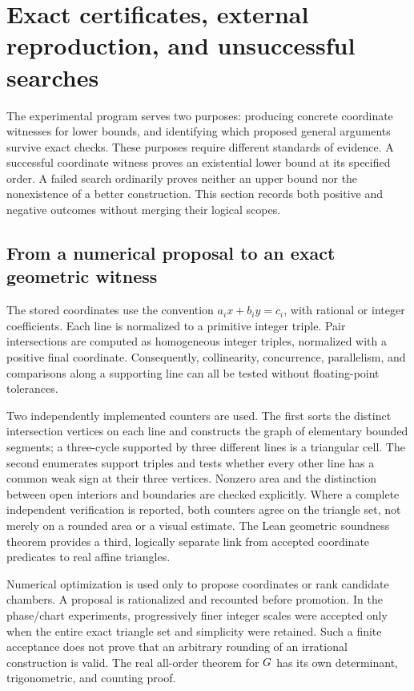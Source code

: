 \section{Exact certificates, external reproduction, and unsuccessful searches}
\label{exp:section}

The experimental program serves two purposes: producing concrete coordinate
witnesses for lower bounds, and identifying which proposed general arguments
survive exact checks. These purposes require different standards of evidence.
A successful coordinate witness proves an existential lower bound at its
specified order. A failed search ordinarily proves neither an upper bound nor
the nonexistence of a better construction. This section records both positive
and negative outcomes without merging their logical scopes.

\subsection{From a numerical proposal to an exact geometric witness}

The stored coordinates use the convention $a_ix+b_iy=c_i$, with rational or
integer coefficients. Each line is normalized to a primitive integer triple.
Pair intersections are computed as homogeneous integer triples, normalized
with a positive final coordinate. Consequently, collinearity, concurrence,
parallelism, and comparisons along a supporting line can all be tested without
floating-point tolerances.

Two independently implemented counters are used. The first sorts the distinct
intersection vertices on each line and constructs the graph of elementary
bounded segments; a three-cycle supported by three different lines is a
triangular cell. The second enumerates support triples and tests whether every
other line has a common weak sign at their three vertices. Nonzero area and
the distinction between open interiors and boundaries are checked explicitly.
Where a complete independent verification is reported, both counters agree on
the triangle set, not merely on a rounded area or a visual estimate. The Lean
geometric soundness theorem provides a third, logically separate link from
accepted coordinate predicates to real affine triangles.

Numerical optimization is used only to propose coordinates or rank candidate
chambers. A proposal is rationalized and recounted before promotion. In the
phase/chart experiments, progressively finer integer scales were accepted only
when the entire exact triangle set and simplicity were retained. Such a finite
acceptance does not prove that an arbitrary rounding of an irrational
construction is valid. The real all-order theorem for $G$ has its own
determinant, trigonometric, and counting proof.

